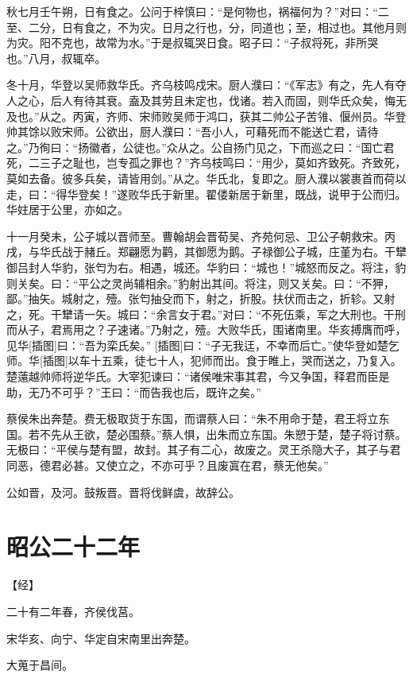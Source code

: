 \documentclass[a4paper,12pt,UTF8,twoside]{ctexbook}
\begin{document}
秋七月壬午朔，日有食之。公问于梓慎曰：“是何物也，祸福何为？”对曰：“二至、二分，日有食之，不为灾。日月之行也，分，同道也；至，相过也。其他月则为灾。阳不克也，故常为水。”于是叔辄哭日食。昭子曰：“子叔将死，非所哭也。”八月，叔辄卒。

冬十月，华登以吴师救华氏。齐乌枝鸣戍宋。厨人濮曰：“《军志》有之，先人有夺人之心，后人有待其衰。盍及其劳且未定也，伐诸。若入而固，则华氏众矣，悔无及也。”从之。丙寅，齐师、宋师败吴师于鸿口，获其二帅公子苦雂、偃州员。华登帅其馀以败宋师。公欲出，厨人濮曰：“吾小人，可藉死而不能送亡君，请待之。”乃徇曰：“扬徽者，公徒也。”众从之。公自扬门见之，下而巡之曰：“国亡君死，二三子之耻也，岂专孤之罪也？”齐乌枝鸣曰：“用少，莫如齐致死。齐致死，莫如去备。彼多兵矣，请皆用剑。”从之。华氏北，复即之。厨人濮以裳裹首而荷以走，曰：“得华登矣！”遂败华氏于新里。翟偻新居于新里，既战，说甲于公而归。华妵居于公里，亦如之。

十一月癸未，公子城以晋师至。曹翰胡会晋荀吴、齐苑何忌、卫公子朝救宋。丙戌，与华氏战于赭丘。郑翩愿为鹳，其御愿为鹅。子禄御公子城，庄堇为右。干犫御吕封人华豹，张匄为右。相遇，城还。华豹曰：“城也！”城怒而反之。将注，豹则关矣。曰：“平公之灵尚辅相余。”豹射出其间。将注，则又关矣。曰：“不狎，鄙。”抽矢。城射之，殪。张匄抽殳而下，射之，折股。扶伏而击之，折轸。又射之，死。干犫请一矢。城曰：“余言女于君。”对曰：“不死伍乘，军之大刑也。干刑而从子，君焉用之？子速诸。”乃射之，殪。大败华氏，围诸南里。华亥搏膺而呼，见华[插图]曰：“吾为栾氏矣。” [插图]曰：“子无我迋，不幸而后亡。”使华登如楚乞师。华[插图]以车十五乘，徒七十人，犯师而出。食于睢上，哭而送之，乃复入。楚薳越帅师将逆华氏。大宰犯谏曰：“诸侯唯宋事其君，今又争国，释君而臣是助，无乃不可乎？”王曰：“而告我也后，既许之矣。”

蔡侯朱出奔楚。费无极取货于东国，而谓蔡人曰：“朱不用命于楚，君王将立东国。若不先从王欲，楚必围蔡。”蔡人惧，出朱而立东国。朱愬于楚，楚子将讨蔡。无极曰：“平侯与楚有盟，故封。其子有二心，故废之。灵王杀隐大子，其子与君同恶，德君必甚。又使立之，不亦可乎？且废寘在君，蔡无他矣。”

公如晋，及河。鼓叛晋。晋将伐鲜虞，故辞公。

\section{昭公二十二年}



【经】

二十有二年春，齐侯伐莒。

宋华亥、向宁、华定自宋南里出奔楚。

大蒐于昌间。
\end{document}
